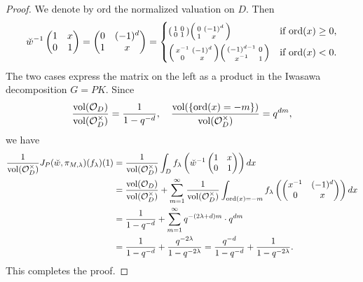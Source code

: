 \documentclass[11pt,reqno]{amsart}
\theoremstyle{plain}
\theoremstyle{definition}
\newcommand{\cO}{\mathcal{O}}
\newcommand{\vol}{\tu{vol}}
\newcommand{\tu}{\textup}
\numberwithin{equation}{subsection}
\begin{document}
\begin{proof}
We denote by $\mathrm{ord}$ the normalized valuation on $D$. 
Then 
\[
\breve{w}^{-1}\begin{pmatrix}
    1 & x \\ 0 & 1
\end{pmatrix}
=
\begin{pmatrix}
    0 & (-1)^d \\ 1 & x
\end{pmatrix}
= \left\{
\begin{aligned}
&\begin{psmallmatrix}
    1 & 0 \\ 0 & 1
\end{psmallmatrix}
\begin{psmallmatrix}
    0 & (-1)^d \\ 1 & x
\end{psmallmatrix}
&&\text{if $\mathrm{ord}(x) \geq 0$}, \\
&\begin{psmallmatrix}
    x^{-1} & (-1)^d \\ 0 & x 
\end{psmallmatrix}
\begin{psmallmatrix}
    (-1)^{d-1} & 0 \\ x^{-1} & 1
\end{psmallmatrix}
&&\text{if $\mathrm{ord}(x) < 0$}.
\end{aligned}
\right. 
\]
The two cases express the matrix on the left as a product in the Iwasawa decomposition $G=PK$.
Since 
\[
\frac{\vol(\cO_D)}{\vol(\cO_D^\times)} = \frac{1}{1-q^{-d}}, 
\quad 
\frac{\vol(\{\mathrm{ord}(x) = -m\})}{\vol(\cO_D^\times)} = q^{dm},
\]
we have
\begin{align*}
    \frac{1}{\vol(\cO_D^\times)}
    J_{P}(\breve{w},\pi_{M,\lambda})(f_\lambda)(1)
    &= 
    \frac{1}{\vol(\cO_D^\times)} 
    \int_D f_\lambda\left(\breve{w}^{-1}
    \begin{pmatrix}
        1 & x \\ 0 & 1
    \end{pmatrix}\right)
    dx
    \\&= \frac{\vol(\cO_D)}{\vol(\cO_D^\times)}
        + \sum_{m = 1}^\infty\frac{1}{\vol(\cO_D^\times)} \int_{\mathrm{ord}(x) = -m} 
        f_\lambda\left(\begin{pmatrix}
    x^{-1} & (-1)^d \\ 0 & x 
\end{pmatrix}\right) dx
    \\&= \frac{1}{1-q^{-d}} + \sum_{m=1}^\infty q^{-(2\lambda+d)m} \cdot q^{dm}
    \\&= \frac{1}{1-q^{-d}} + \frac{q^{-2\lambda}}{1-q^{-2\lambda}}
    = \frac{q^{-d}}{1-q^{-d}} + \frac{1}{1-q^{-2\lambda}}.
\end{align*}
This completes the proof.
\end{proof}
\end{document}
